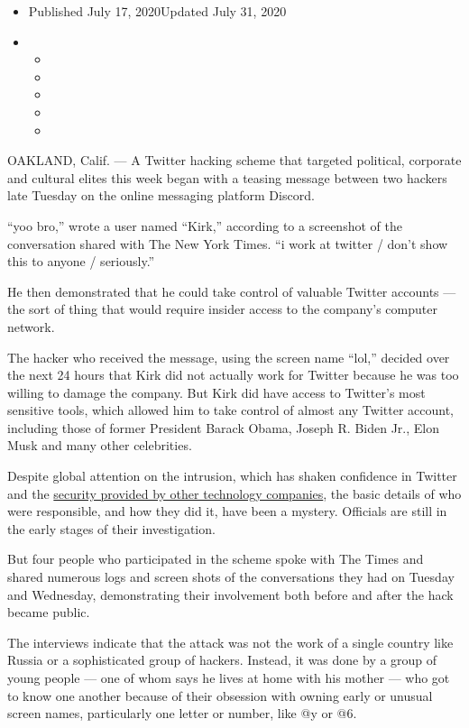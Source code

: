 \begin{itemize}
\item
  Published July 17, 2020Updated July 31, 2020
\item
  \begin{itemize}
  \item
  \item
  \item
  \item
  \item
  \end{itemize}
\end{itemize}

OAKLAND, Calif. --- A Twitter hacking scheme that targeted political,
corporate and cultural elites this week began with a teasing message
between two hackers late Tuesday on the online messaging platform
Discord.

``yoo bro,'' wrote a user named ``Kirk,'' according to a screenshot of
the conversation shared with The New York Times. ``i work at twitter /
don't show this to anyone / seriously.''

He then demonstrated that he could take control of valuable Twitter
accounts --- the sort of thing that would require insider access to the
company's computer network.

The hacker who received the message, using the screen name ``lol,''
decided over the next 24 hours that Kirk did not actually work for
Twitter because he was too willing to damage the company. But Kirk did
have access to Twitter's most sensitive tools, which allowed him to take
control of almost any Twitter account, including those of former
President Barack Obama, Joseph R. Biden Jr., Elon Musk and many other
celebrities.

Despite global attention on the intrusion, which has shaken confidence
in Twitter and the
\href{https://www.nytimes3xbfgragh.onion/2020/07/16/us/politics/twitter-hack.html}{security
provided by other technology companies}, the basic details of who were
responsible, and how they did it, have been a mystery. Officials are
still in the early stages of their investigation.

But four people who participated in the scheme spoke with The Times and
shared numerous logs and screen shots of the conversations they had on
Tuesday and Wednesday, demonstrating their involvement both before and
after the hack became public.

The interviews indicate that the attack was not the work of a single
country like Russia or a sophisticated group of hackers. Instead, it was
done by a group of young people --- one of whom says he lives at home
with his mother --- who got to know one another because of their
obsession with owning early or unusual screen names, particularly one
letter or number, like @y or @6.

